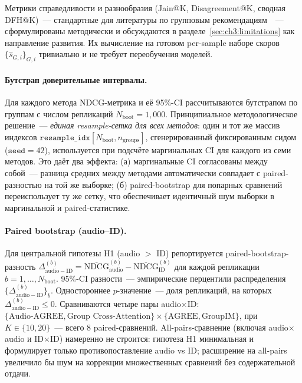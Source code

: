 Метрики справедливости и разнообразия (Jain@K, Disagreement@K, сводная DFH@K)~--- стандартные для литературы по групповым рекомендациям~\cite{jin2023fairness_survey}~--- сформулированы методически и обсуждаются в разделе~\ref{sec:ch3:limitations} как направление развития. Их вычисление на готовом per-sample наборе скоров $\{\hat{s}_{G, i}\}_{G, i}$ тривиально и не требует переобучения моделей.

\paragraph{Бутстрап доверительные интервалы.} Для каждого метода NDCG-метрика и её 95\%-CI рассчитываются бутстрапом по группам с числом репликаций $N_{\mathrm{boot}} = 1{,}000$. Принципиальное методологическое решение~--- \emph{единая resample-сетка для всех методов}: один и тот же массив индексов $\mathtt{resample\_idx}[N_{\mathrm{boot}}, n_{\mathrm{groups}}]$, сгенерированный фиксированным сидом ($\mathtt{seed} = 42$), используется при подсчёте маргинальных CI для каждого из семи методов. Это даёт два эффекта: (а) маргинальные CI согласованы между собой~--- разница средних между методами автоматически совпадает с paired-разностью на той же выборке; (б) paired-bootstrap для попарных сравнений переиспользует ту же сетку, что обеспечивает идентичный шум выборки в маргинальной и paired-статистике.

\paragraph{Paired bootstrap (audio--ID).} Для центральной гипотезы H1 (audio $>$ ID) репортируется paired-bootstrap-разность $\Delta_{\mathrm{audio} - \mathrm{ID}}^{(b)} = \overline{\mathrm{NDCG}}_{\mathrm{audio}}^{(b)} - \overline{\mathrm{NDCG}}_{\mathrm{ID}}^{(b)}$ для каждой репликации $b = 1, \ldots, N_{\mathrm{boot}}$. 95\%-CI разности~--- эмпирические перцентили распределения $\{\Delta_{\mathrm{audio} - \mathrm{ID}}^{(b)}\}_{b}$. Одностороннее $p$-значение~--- доля репликаций, на которых $\Delta_{\mathrm{audio} - \mathrm{ID}}^{(b)} \leq 0$. Сравниваются четыре пары audio${\times}$ID: $\{\text{Audio-AGREE}, \text{Group Cross-Attention}\} \times \{\text{AGREE}, \text{GroupIM}\}$, при $K \in \{10, 20\}$~--- всего 8 paired-сравнений. All-pairs-сравнение (включая audio${\times}$audio и ID${\times}$ID) намеренно не строится: гипотеза H1 минимальная и формулирует только противопоставление audio vs ID; расширение на all-pairs увеличило бы шум на коррекции множественных сравнений без содержательной отдачи.

